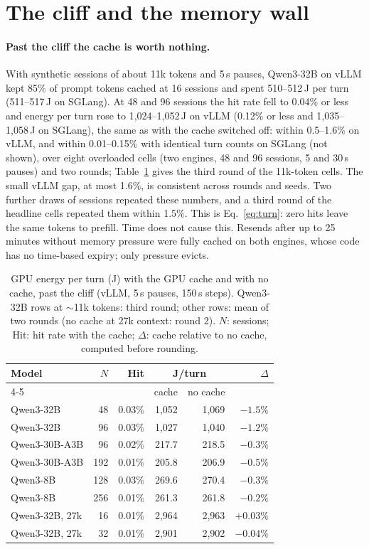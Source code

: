 \section{The cliff and the memory wall}
\label{sec:cliff}

\paragraph{Past the cliff the cache is worth nothing.} With synthetic sessions of about 11k tokens and 5\,s pauses,
Qwen3-32B on vLLM kept 85\% of prompt tokens cached at 16 sessions and spent 510--512\,J per turn (511--517\,J on SGLang). At 48 and 96
sessions the hit rate fell to 0.04\% or less and energy per turn rose to 1,024--1,052\,J on vLLM (0.12\% or less and
1,035--1,058\,J on SGLang), the same as with the cache switched
off: within 0.5--1.6\% on vLLM, and within 0.01--0.15\% with identical turn counts on SGLang (not shown), over eight overloaded
cells (two engines, 48 and 96 sessions, 5 and 30\,s pauses) and two rounds; Table~\ref{tab:cliff} gives the third round of the 11k-token cells. The small vLLM gap, at most 1.6\%, is consistent across rounds and seeds. Two
further draws of sessions repeated these numbers, and a third round of the headline cells repeated them within 1.5\%.
This is Eq.~\eqref{eq:turn}: zero hits leave the same tokens to prefill. Time does not cause this. Resends after up
to 25 minutes without memory pressure were fully cached on both engines, whose code has no time-based expiry; only
pressure evicts.

\begin{table}[t]
\centering\small
\caption{GPU energy per turn (J) with the GPU cache and with no cache, past the cliff (vLLM, 5\,s pauses, 150\,s steps).
Qwen3-32B rows at $\sim$11k tokens: third round; other rows: mean of two rounds (no cache at 27k context: round 2). $N$: sessions; Hit: hit rate with the cache; $\Delta$: cache relative to no cache, computed before rounding.}
\label{tab:cliff}
\setlength{\tabcolsep}{3pt}
\begin{tabular}{lrrrrr}
\toprule
Model & $N$ & Hit & \multicolumn{2}{c}{J/turn} & $\Delta$ \\
\cmidrule(lr){4-5}
 & & & cache & no cache & \\
\midrule
Qwen3-32B & 48 & 0.03\% & 1,052 & 1,069 & $-1.5\%$ \\
Qwen3-32B & 96 & 0.03\% & 1,027 & 1,040 & $-1.2\%$ \\
Qwen3-30B-A3B & 96 & 0.02\% & 217.7 & 218.5 & $-0.3\%$ \\
Qwen3-30B-A3B & 192 & 0.01\% & 205.8 & 206.9 & $-0.5\%$ \\
Qwen3-8B & 128 & 0.03\% & 269.6 & 270.4 & $-0.3\%$ \\
Qwen3-8B & 256 & 0.01\% & 261.3 & 261.8 & $-0.2\%$ \\
Qwen3-32B, 27k & 16 & 0.01\% & 2,964 & 2,963 & $+0.03\%$ \\
Qwen3-32B, 27k & 32 & 0.01\% & 2,901 & 2,902 & $-0.04\%$ \\
\bottomrule
\end{tabular}
\end{table}

